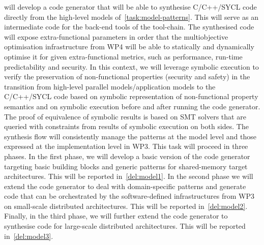 \begin{Workpackage}{\thewpno}
\begin{Task}

\TaskResults{
\ref{del:model1}
\ref{del:model2}
\ref{del:model3}
}
\TaskHeader{}
\theTask{} will develop a code generator that will be able to synthesise C/C++/SYCL code directly from the high-level models of~\ref{task:model-patterns}.
This will serve as an intermediate code for the back-end tools of
the \TheProject{} tool-chain. The synthesised code will expose
extra-functional parameters in order that the multiobjective
optimisation infrastructure from WP4 will be able to statically and
dynamically optimise it for given extra-functional metrics, such as
performance, run-time predictability and security. In this context, we will leverage symbolic execution to verify the preservation of non-functional properties (security and safety) in the transition from high-level parallel models/application models to the C/C++/SYCL code based on symbolic representation of non-functional property semantics and on symbolic execution before and after running the code generator. The proof of equivalence of symbolic results is based on SMT solvers that are queried with constraints from results of symbolic execution on both sides.%
The synthesis flow will
consistently manage the patterns at the model level and those
expressed at the implementation level in WP3.  This task will proceed in three phases. In the first phase, we will develop a basic version of the code generator targeting basic building blocks and generic patterns for shared-memory target architectures. This will be reported in~\ref{del:model1}.
In the second phase we will extend the code generator to deal with domain-specific
patterns and generate code that can be orchestrated by the software-defined infrastructures from WP3 on small-scale distributed architectures. This will be reported in~\ref{del:model2}. Finally, in the third phase, we will further extend the code generator to synthesise code for large-scale distributed architectures. This will be reported in~\ref{del:model3}.
\end{Task}


\end{Workpackage}
